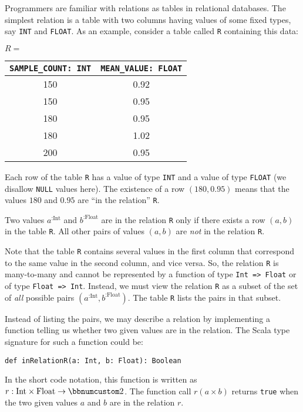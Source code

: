 Programmers are familiar with relations as tables in relational databases.
The simplest relation is a table with two columns having values of
some fixed types, say \lstinline!INT! and \lstinline!FLOAT!. As
an example, consider a table called \lstinline!R! containing this
data:
\begin{center}
$R=$ %
\begin{tabular}{|c|c|}
\hline 
\lstinline!SAMPLE_COUNT: INT! & \lstinline!MEAN_VALUE: FLOAT!\tabularnewline
\hline 
\hline 
{\footnotesize{}150} & {\footnotesize{}0.92}\tabularnewline
\hline 
{\footnotesize{}150} & {\footnotesize{}0.95}\tabularnewline
\hline 
{\footnotesize{}180} & {\footnotesize{}0.95}\tabularnewline
\hline 
{\footnotesize{}180} & {\footnotesize{}1.02}\tabularnewline
\hline 
{\footnotesize{}200} & {\footnotesize{}0.95}\tabularnewline
\hline 
\end{tabular}
\par\end{center}

Each row of the table \lstinline!R! has a value of type \lstinline!INT!
and a value of type \lstinline!FLOAT! (we disallow \lstinline!NULL!
values here). The existence of a row $\left(180,0.95\right)$ means
that the values $180$ and $0.95$ are \textsf{``}in the relation\textsf{''} \lstinline!R!.

Two values $a^{:\text{Int}}$ and $b^{:\text{Float}}$ are in the
relation \lstinline!R! only if there exists a row $\left(a,b\right)$
in the table \lstinline!R!. All other pairs of values $\left(a,b\right)$
are \emph{not} in the relation \lstinline!R!. 

Note that the table \lstinline!R! contains several values in the
first column that correspond to the same value in the second column,
and vice versa. So, the relation \lstinline!R! is many-to-many and
cannot be represented by a function of type \lstinline!Int => Float!
or of type \lstinline!Float => Int!. Instead, we must view the relation
\lstinline!R! as a subset of the set of \emph{all} possible pairs
$(a^{:\text{Int}},b^{:\text{Float}})$. The table \lstinline!R! lists
the pairs in that subset.

Instead of listing the pairs, we may describe a relation by implementing
a function telling us whether two given values are in the relation.
The Scala type signature for such a function could be:
\begin{lstlisting}
def inRelationR(a: Int, b: Float): Boolean
\end{lstlisting}
In the short code notation, this function is written as $r:\text{Int}\times\text{Float}\rightarrow\bbnum 2$.
The function call $r(a\times b)$ returns \lstinline!true! when the
two given values $a$ and $b$ are in the relation $r$.

